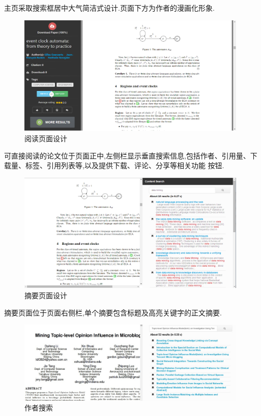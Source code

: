 主页采取搜索框居中大气简洁式设计.页面下方为作者的漫画化形象.

\begin{figure}[H]
  \small
  \centering
  \includegraphics[width=11cm]{img/reading.png}
  \caption{阅读页面设计}
\end{figure}
可直接阅读的论文位于页面正中,左侧栏显示垂直搜索信息,包括作者、引用量、下载量、标签、引用列表等,以及提供下载、评论、分享等相关功能 按钮.

\begin{figure}[H]
  \small
  \centering
  \includegraphics[width=11cm]{img/summary.png}
  \caption{摘要页面设计}
\end{figure}

摘要页面位于页面右侧栏,单个摘要包含标题及高亮关键字的正文摘要.

\begin{figure}[H]
  \small
  \centering
  \includegraphics[width=11cm]{img/author.png}
  \caption{作者搜索}
\end{figure}


